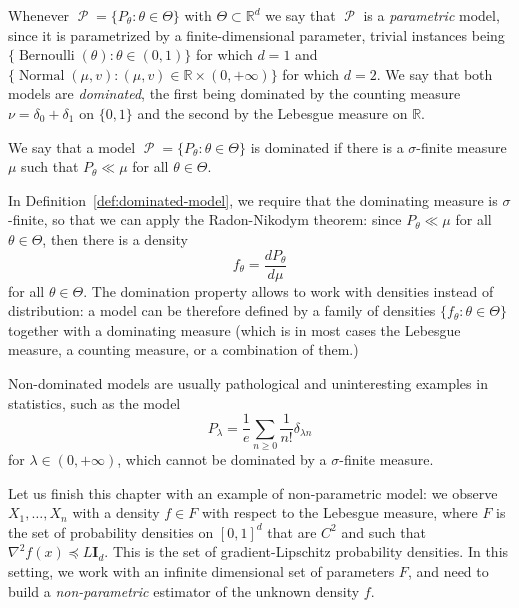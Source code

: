 \documentclass[
	fontsize=11pt, %
	twoside=false, %
	numbers=noenddot, %
]{kaobook}
\DeclareMathOperator{\cP}{\mathcal P}
\DeclareMathOperator{\nor}{Normal}
\DeclareMathOperator{\ber}{Bernoulli}
\newcommand{\R}{\mathbb R}
\newcommand{\grad}{\nabla}
\newcommand{\mleq}{\preccurlyeq}
\begin{document}
Whenever $\cP = \{ P_\theta : \theta \in \Theta \}$ with $\Theta \subset \R^d$ we say that $\cP$ is a \emph{parametric} model, since it is parametrized by a finite-dimensional parameter, trivial instances being $\{ \ber(\theta) : \theta \in (0, 1) \}$ for which $d=1$ and $\{ \nor(\mu, v) : (\mu, v) \in \R \times (0, +\infty) \}$ for which $d=2$.
We say that both models are \emph{dominated}, the first being dominated by the counting measure $\nu = \delta_0 + \delta_1$ on $\{ 0, 1\}$ and the second by the Lebesgue measure on $\R$.
\begin{definition}
	\label{def:dominated-model}
	We say that a model $\cP = \{ P_\theta : \theta \in \Theta \}$ is dominated if there is a $\sigma$-finite measure $\mu$ such that $P_\theta \ll \mu$ for all $\theta \in \Theta$.
\end{definition}
In Definition~\ref{def:dominated-model}, we require that the dominating measure is $\sigma$-finite, so that we can apply the Radon-Nikodym theorem: since $P_\theta \ll \mu$ for all $\theta \in \Theta$, then there is a density 
\begin{equation*}
	f_\theta = \frac{dP_\theta}{d\mu}
\end{equation*}
for all $\theta \in \Theta$.
The domination property allows to work with densities instead of distribution: a model can be therefore defined by a family of densities $\{ f_\theta : \theta \in \Theta \}$ together with a dominating measure (which is in most cases the Lebesgue measure, a counting measure, or a combination of them.)

Non-dominated models are usually pathological and uninteresting examples in statistics, such as the model
\begin{equation*}
	P_\lambda = \frac 1e \sum_{n \geq 0} \frac{1}{n!} \delta_{\lambda n}
\end{equation*}
for $\lambda \in (0, +\infty)$, which cannot be dominated by a $\sigma$-finite measure.

Let us finish this chapter with an example of non-parametric model: we observe $X_1, \ldots, X_n$ with a density $f \in F$ with respect to the Lebesgue measure, where $F$ is the set of probability densities on $[0, 1]^d$ that are $C^2$ and such that $\grad^2 f(x) \mleq L \mathbf I_d$. This is the set of gradient-Lipschitz probability densities.
In this setting, we work with an infinite dimensional set of parameters $F$, and need to build a \emph{non-parametric} estimator of the unknown density $f$.
\end{document}
